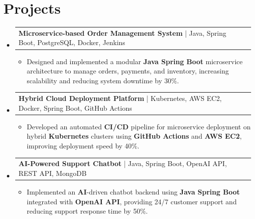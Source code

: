 \documentclass[letterpaper,10pt]{article}
\makeatletter
\newcommand{\resumeItem}[1]{
  \item{\fontsize{8pt}{9pt}\selectfont
    #1 \vspace{-3pt}
  }
}
\newcommand{\resumeProjectHeading}[2]{
    \item
    \begin{tabular*}{1.001\textwidth}{l@{\extracolsep{\fill}}r}
      \fontsize{8.5pt}{10pt}#1 & \textbf{\fontsize{8.5pt}{10pt} #2}\\
    \end{tabular*}\vspace{-7pt}
}
\newcommand{\resumeSubHeadingListStart}{\begin{itemize}[leftmargin=0pt, label={}]}
\newcommand{\resumeSubHeadingListEnd}{\end{itemize}}
\newcommand{\resumeItemListStart}{\begin{itemize}[leftmargin=*]}
\newcommand{\resumeItemListEnd}{\end{itemize}\vspace{-5pt}}
\makeatother
\begin{document}
\section{Projects}
    \vspace{-5pt}
    \resumeSubHeadingListStart
          \resumeProjectHeading
            {\textbf{Microservice-based Order Management System} | Java, Spring Boot, PostgreSQL, Docker, Jenkins}{}
            \resumeItemListStart
                \resumeItem{Designed and implemented a modular \textbf{Java Spring Boot} microservice architecture to manage orders, payments, and inventory, increasing scalability and reducing system downtime by 30\%.}
            \resumeItemListEnd
        \vspace{-12pt}
    
        \resumeProjectHeading
            {\textbf{Hybrid Cloud Deployment Platform} | Kubernetes, AWS EC2, Docker, Spring Boot, GitHub Actions}{}
        \resumeItemListStart
                \resumeItem{Developed an automated \textbf{CI/CD} pipeline for microservice deployment on hybrid \textbf{Kubernetes} clusters using \textbf{GitHub Actions} and \textbf{AWS EC2}, improving deployment speed by 40\%.}
        \resumeItemListEnd
      \vspace{-12pt}
      \resumeProjectHeading
        {\textbf{AI-Powered Support Chatbot} | Java, Spring Boot, OpenAI API, REST API, MongoDB}{}
    \resumeItemListStart
            \resumeItem{Implemented an \textbf{AI}-driven chatbot backend using \textbf{Java Spring Boot} integrated with \textbf{OpenAI API}, providing 24/7 customer support and reducing support response time by 50\%.}
    \resumeItemListEnd
    \resumeSubHeadingListEnd
\end{document}
